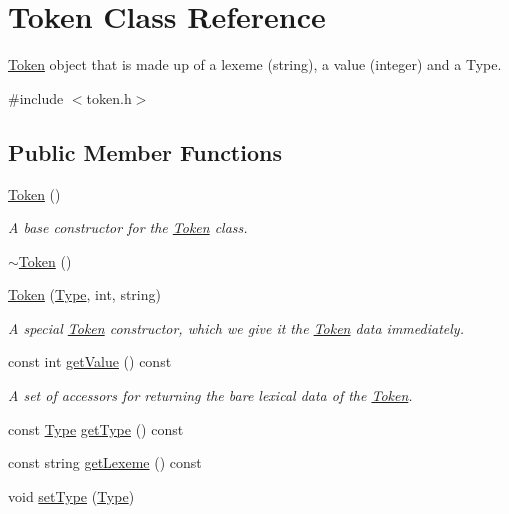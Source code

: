 \hypertarget{classToken}{
\section{Token Class Reference}
\label{classToken}
}


\hyperlink{classToken}{Token} object that is made up of a lexeme (string), a value (integer) and a Type.  




{\ttfamily \#include $<$token.h$>$}

\subsection*{Public Member Functions}
\begin{DoxyCompactItemize}
\item 
\hyperlink{classToken_aa3c5868ba4115f3189df6b2ac5b36f39}{Token} ()
\begin{DoxyCompactList}\small\item\em A base constructor for the \hyperlink{classToken}{Token} class. \end{DoxyCompactList}\item 
\hyperlink{classToken_a3d7d59eaac1535df1433357d5d372f84}{$\sim$Token} ()
\item 
\hyperlink{classToken_abe7d4640c0784e490bccaa254f11a8d9}{Token} (\hyperlink{token_8h_a1d1cfd8ffb84e947f82999c682b666a7}{Type}, int, string)
\begin{DoxyCompactList}\small\item\em A special \hyperlink{classToken}{Token} constructor, which we give it the \hyperlink{classToken}{Token} data immediately. \end{DoxyCompactList}\item 
const int \hyperlink{classToken_a9241d3f6b9174f79cdc74e824a3b8422}{getValue} () const 
\begin{DoxyCompactList}\small\item\em A set of accessors for returning the bare lexical data of the \hyperlink{classToken}{Token}. \end{DoxyCompactList}\item 
const \hyperlink{token_8h_a1d1cfd8ffb84e947f82999c682b666a7}{Type} \hyperlink{classToken_ab0fd5697b1b85d91ac491e687a2044f2}{getType} () const 
\item 
const string \hyperlink{classToken_af056820e37b409c87f7bb17ea8139a42}{getLexeme} () const 
\item 
void \hyperlink{classToken_a693d12716fcbf365e115dde0314ee306}{setType} (\hyperlink{token_8h_a1d1cfd8ffb84e947f82999c682b666a7}{Type})

\end{DoxyCompactItemize}
